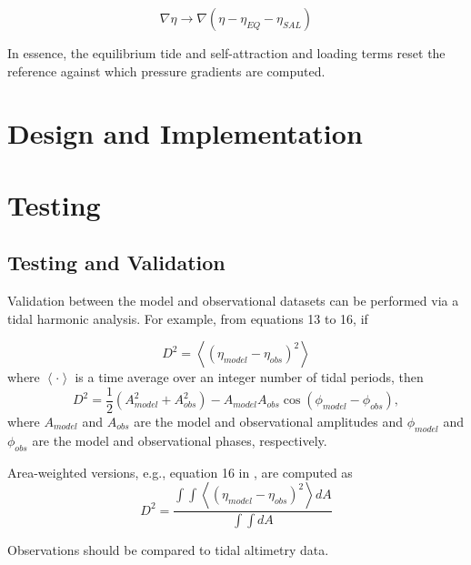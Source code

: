 \begin{equation}
    \nabla\eta \rightarrow \nabla\left( \eta - \eta_{EQ} - \eta_{SAL}\right)
\end{equation}

In essence, the equilibrium tide and self-attraction and loading terms reset the reference against which pressure gradients are computed.



\chapter{Design and Implementation}



\chapter{Testing}

\section{Testing and Validation}

Validation between the model and observational datasets can be performed via a tidal harmonic analysis.  For example, from \citep{chassignet_primer_2018} equations 13 to 16, if 

\begin{equation}
    D^2 = \left< (\eta_{model} - \eta_{obs})^{2} \right>
\end{equation}
where $\left< \cdot \right>$ is a time average over an integer number of tidal periods, then 
\begin{equation}
    D^2 = \frac{1}{2}\left(A_{model}^2 + A_{obs}^2\right) - A_{model}A_{obs}\cos\left(\phi_{model} - \phi_{obs}\right),
\end{equation}
where $A_{model}$ and $A_{obs}$ are the model and observational amplitudes and $\phi_{model}$ and $\phi_{obs}$ are the model and observational phases, respectively.

Area-weighted versions, e.g., equation 16 in \citep{chassignet_primer_2018}, are computed as 
\begin{equation}
    D^2 = \frac{\int \int \left< \left(\eta_{model} - \eta_{obs}\right)^2\right>dA}{\int \int dA}
\end{equation}

Observations should be compared to tidal altimetry data.







